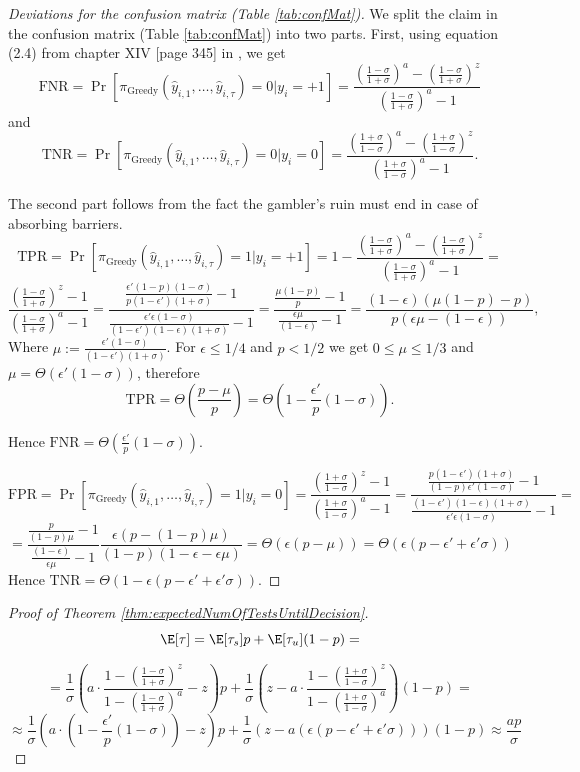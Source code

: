 \begin{proof}[Deviations for the confusion matrix (Table \ref{tab:confMat})]
We split the claim in the confusion matrix (Table \ref{tab:confMat}) into two parts.
First, using equation (2.4) from chapter XIV [page 345] in \cite{feller1}, we get
\[
\text{FNR}=\Pr[\pi_{\text{Greedy}}(\hat{y}_{i,1},\dots,\hat{y}_{i,\tau})=0|y_i=+1]=\frac{(\frac{1-\sigma}{1+\sigma})^a-(\frac{1-\sigma}{1+\sigma})^z}{(\frac{1-\sigma}{1+\sigma})^a-1}
\]
and
\[
\text{TNR}=\Pr[\pi_{\text{Greedy}}(\hat{y}_{i,1},\dots,\hat{y}_{i,\tau})=0|y_i=0]=\frac{(\frac{1+\sigma}{1-\sigma})^a-(\frac{1+\sigma}{1-\sigma})^z}{(\frac{1+\sigma}{1-\sigma})^a-1}.
\]

The second part follows from the fact the gambler's ruin must end in case of absorbing barriers. 
\[
\text{TPR}=\Pr[\pi_{\text{Greedy}}(\hat{y}_{i,1},\dots,\hat{y}_{i,\tau})=1|y_i=+1]=1-\frac{(\frac{1-\sigma}{1+\sigma})^a-(\frac{1-\sigma}{1+\sigma})^z}{(\frac{1-\sigma}{1+\sigma})^a-1}=\]
\[
\frac{(\frac{1-\sigma}{1+\sigma})^z-1}{(\frac{1-\sigma}{1+\sigma})^a-1}=
\frac{\frac{\epsilon'(1-p)(1-\sigma)}
{p(1-\epsilon')(1+\sigma)}-1}
{\frac{\epsilon'\epsilon(1-\sigma)}{(1-\epsilon')(1-\epsilon)(1+\sigma)}-1}=
\frac{\frac{\mu(1-p)}{p}-1}
{\frac{\epsilon\mu}{(1-\epsilon)}-1}=
\frac{(1-\epsilon)(\mu(1-p)-p)}
{p(\epsilon\mu-(1-\epsilon))},
\]
Where $\mu:=\frac{\epsilon'(1-\sigma)}{(1-\epsilon')(1+\sigma)}$. For $\epsilon\leq 1/4$ and $p< 1/2$ we get $0\leq\mu \leq 1/3$ and $\mu=\Theta(\epsilon'(1-\sigma))$, therefore
\[
\text{TPR}=\Theta \left(\frac{p-\mu}{p}\right)=
\Theta\left(1-\frac{\epsilon'}{p}(1-\sigma)\right).
\]

Hence $\text{FNR}=\Theta(\frac{\epsilon'}{p}(1-\sigma))$.

\[
\text{FPR}=\Pr[\pi_{\text{Greedy}}(\hat{y}_{i,1},\dots,\hat{y}_{i,\tau})=1|y_i=0]=\frac{(\frac{1+\sigma}{1-\sigma})^{z}-1}{(\frac{1+\sigma}{1-\sigma})^{a}-1}=
\frac{\frac{p(1-\epsilon')(1+\sigma)}{(1-p)\epsilon'(1-\sigma)}-1}
{\frac{(1-\epsilon')(1-\epsilon)(1+\sigma)}{\epsilon'\epsilon(1-\sigma)}-1}=\]
\[
=
\frac{\frac{p}{(1-p)\mu}-1}
{\frac{(1-\epsilon)}{\epsilon \mu}-1}\frac{\epsilon(p-(1-p)\mu)}{(1-p)(1-\epsilon-\epsilon\mu)}
=\Theta\left(\epsilon(p-\mu) \right)
=\Theta\left(\epsilon(p-\epsilon'+\epsilon'\sigma) \right)
\]
Hence $\text{TNR}=\Theta\left(1-\epsilon(p-\epsilon'+\epsilon'\sigma) \right)$.
\end{proof}

\begin{proof}[Proof of Theorem \ref{thm:expectedNumOfTestsUntilDecision}]

\[
\E[\tau]=\E[\tau_{s}]p+\E[\tau_{u}](1-p)=
\]

\[
=\frac{1}{\sigma}\left(a\cdot\frac{1-(\frac{1-\sigma}{1+\sigma})^{z}}{1-(\frac{1-\sigma}{1+\sigma})^{a}}-z\right)p+
\frac{1}{\sigma}\left(z-a\cdot\frac{1-(\frac{1+\sigma}{1-\sigma})^{z}}{1-(\frac{1+\sigma}{1-\sigma})^{a}}\right)(1-p)=
\]
\[
\approx\frac{1}{\sigma}\left(a\cdot(1-\frac{\epsilon'}{p}(1-\sigma))-z\right)p+
\frac{1}{\sigma}(z-a(\epsilon(p-\epsilon'+\epsilon'\sigma)))(1-p)\approx \frac{ap}{\sigma}
\]
\end{proof}
